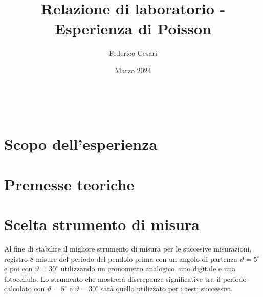 \documentclass{article}
\title{Relazione di laboratorio - Esperienza di Poisson}
\author{Federico Cesari}
\date{Marzo 2024}
\begin{document}

\tableofcontents

\newpage
\textcolor{white}{.}
\vfill


\section{Scopo dell’esperienza}
\section{Premesse teoriche}
\section{Scelta strumento di misura}

Al fine di stabilire il migliore strumento di misura per le succesive misurazioni, registro 8 misure del periodo del pendolo prima con un angolo di partenza $\vartheta = 5^\circ$ e poi con $\vartheta = 30^\circ$ utilizzando un cronometro analogico, uno digitale e una fotocellula. Lo strumento che mostrerà discrepanze significative tra il periodo calcolato con $\vartheta = 5^\circ$ e $\vartheta = 30^\circ$ sarà quello utilizzato per i testi successivi.
\end{document}
